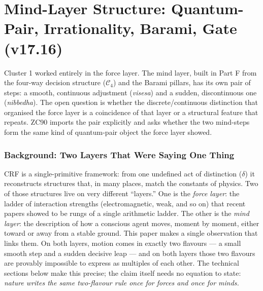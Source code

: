 \documentclass[12pt, a4paper]{article}
\begin{document}


\part{Mind-Layer Structure: Quantum-Pair, Irrationality, Barami, Gate (v17.16)}
\label{part:LVIII}

\noindent
Cluster 1 worked entirely in the force layer. The mind layer, built in
Part F from the four-way decision structure ($\mathcal{C}_4$) and the
Barami pillars, has its own pair of steps: a smooth, continuous adjustment
(\textit{visesa}) and a sudden, discontinuous one (\textit{nibbedha}). The
open question is whether the discrete/continuous distinction that organised
the force layer is a coincidence of that layer or a structural feature that
repeats. ZC90 imports the pair explicitly and asks whether the two mind-steps
form the same kind of quantum-pair object the force layer showed.
\section{Background: Two Layers That Were Saying One Thing}
\label{sec:background-zc90}

CRF is a single-primitive framework: from one undefined act of
distinction ($\delta$) it reconstructs structures that, in many places,
match the constants of physics. Two of those structures live on very
different ``layers.'' One is the \emph{force layer}: the ladder of
interaction strengths (electromagnetic, weak, and so on) that recent
papers showed to be rungs of a single arithmetic ladder. The other is
the \emph{mind layer}: the description of how a conscious agent moves,
moment by moment, either toward or away from a stable ground. This paper
makes a single observation that links them. On both layers, motion comes
in exactly two flavours --- a small smooth step and a sudden decisive
leap --- and on both layers those two flavours are provably impossible to
express as multiples of each other. The technical sections below make
this precise; the claim itself needs no equation to state: \emph{nature
writes the same two-flavour rule once for forces and once for minds.}
\end{document}

